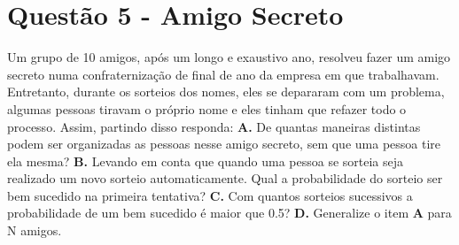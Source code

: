 \documentclass[a4paper, 12pt]{article}
\begin{document}
\section*{Questão 5 - Amigo Secreto}
\large {Um grupo de 10 amigos, após um longo e exaustivo ano, resolveu fazer um amigo secreto numa confraternização de final de ano da empresa em que trabalhavam. Entretanto, durante os sorteios dos nomes, eles se depararam com um problema, algumas pessoas tiravam o próprio nome e eles tinham que refazer todo o processo. Assim, partindo disso responda:}
\newline
\newline
\textbf{A.}  De quantas maneiras distintas podem ser organizadas as pessoas nesse amigo secreto, sem que uma pessoa tire ela mesma?
\newline
\newline
\textbf{B.} Levando em conta que quando uma pessoa se sorteia seja realizado um novo sorteio automaticamente. Qual a probabilidade do sorteio ser bem sucedido na primeira tentativa?
\newline
\newline
\textbf{C.}  Com quantos sorteios sucessivos a probabilidade de um bem sucedido é maior que 0.5?
\newline
\newline
\textbf{D.} Generalize o item \textbf{A} para N amigos.
\end{document}
